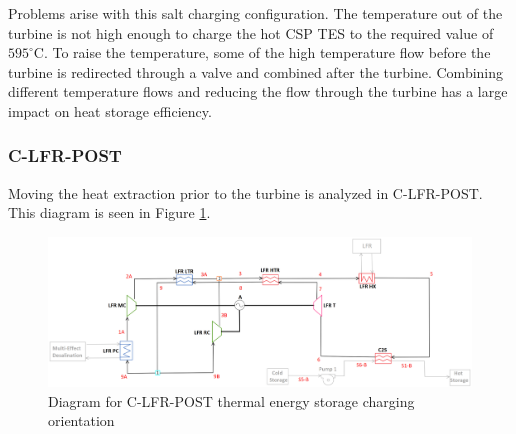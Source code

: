 \begin{paracol}{2}
\linenumbers
\switchcolumn

Problems arise with this salt charging configuration. The temperature out of the turbine is not high enough to charge the hot CSP TES to the required value of $595^{\circ}$C. To raise the temperature, some of the high temperature flow before the turbine is redirected through a valve and combined after the turbine. Combining different temperature flows and reducing the flow through the turbine has a large impact on heat storage efficiency. 



\subsubsection{C-LFR-POST} 

Moving the heat extraction prior to the turbine is analyzed in C-LFR-POST. This diagram is seen in Figure \ref{c-lfr-post}.

\end{paracol}
\begin{figure}[H]
    \widefigure
    \includegraphics[width=\linewidth]{Definitions/c-lfr-post.pdf}
    \caption{Diagram for C-LFR-POST thermal energy storage charging orientation\label{c-lfr-post}}
\end{figure}
